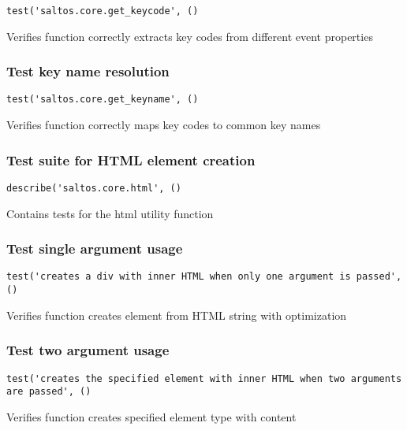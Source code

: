 \documentclass[a4paper]{article}
\begin{document}
\begin{lstlisting}
test('saltos.core.get_keycode', ()
\end{lstlisting}

Verifies function correctly extracts key codes from different event properties

\hypertarget{toc502}{}
\subsubsection{Test key name resolution}

\begin{lstlisting}
test('saltos.core.get_keyname', ()
\end{lstlisting}

Verifies function correctly maps key codes to common key names

\hypertarget{toc503}{}
\subsubsection{Test suite for HTML element creation}

\begin{lstlisting}
describe('saltos.core.html', ()
\end{lstlisting}

Contains tests for the html utility function

\hypertarget{toc504}{}
\subsubsection{Test single argument usage}

\begin{lstlisting}
test('creates a div with inner HTML when only one argument is passed', ()
\end{lstlisting}

Verifies function creates element from HTML string with optimization

\hypertarget{toc505}{}
\subsubsection{Test two argument usage}

\begin{lstlisting}
test('creates the specified element with inner HTML when two arguments are passed', ()
\end{lstlisting}

Verifies function creates specified element type with content
\end{document}
